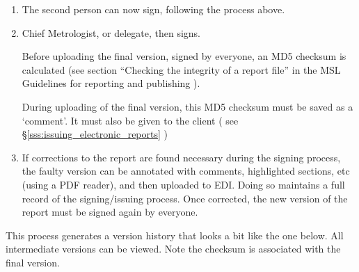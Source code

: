 {\begin{enumerate}
The person who signed the file must be the one to upload the new version to EDI.

Note,
\begin{itemize}
\item the document must be opened with a PDF reader running on a local machine (this is a technical problem: at the moment, it is not possible to directly sign and re-store the document while in a browser)
\item it is not necessary to initial each page (as is done with paper reports)
\item the file name must not be changed: EDI will hide the previous version and record who uploaded the new version
\end{itemize}

\item The second person can now sign, following the process above.
\item Chief Metrologist, or delegate, then signs. 

Before uploading the final version, signed by everyone, an MD5 checksum is calculated (see section ``Checking the integrity of a report file'' in the MSL Guidelines for reporting and publishing \cite{MSL_Reporting_Guidelines}). 

During uploading of the final version, this MD5 checksum must be saved as a `comment'. It must also be given to the client ( see \S\ref{sss:issuing_electronic_reports} )

\item If corrections to the report are found necessary during the signing process, the faulty version can be annotated with comments, highlighted sections, etc (using a PDF reader), and then uploaded to EDI. Doing so maintains a full record of the signing/issuing process. Once corrected, the new version of the report must be signed again by everyone.
\end{enumerate}

This process generates a version history that looks a bit like the one below. All intermediate versions can be viewed. Note the checksum is associated with the final version.

}
